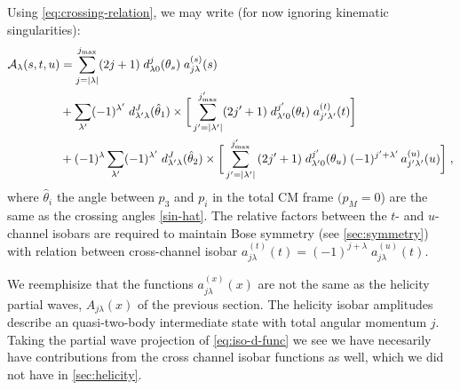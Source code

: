  Using \cref{eq:crossing-relation}, we may write (for now ignoring kinematic singularities):
\begin{align}
  \label{eq:iso-d-func}
   \mathcal{A}_\lambda(s,t,u) &= \sum_{j = |\lambda|}^{{j_\text{max}}} (2 j+1) \; d_{\lambda0}^j(\theta_s) \; a_{j \lambda}^{(s)}(s)
    \nonumber \\
   &+ \sum_{\lambda^\prime} (-1)^{\lambda^\prime} \; d_{{\lambda^\prime} \lambda}^J(\hat{\theta}_1) \times
   \bigg[
   \sum_{{j^\prime} =  |{\lambda^\prime}|}^{{j^\prime_\text{max}}} (2{j^\prime}+1) \; d_{{\lambda^\prime}0}^{j^\prime}(\theta_t) \; a_{{j^\prime} {\lambda^\prime}}^{(t)}(t)
   \bigg] \\
  &+  (-1)^\lambda \sum_{{\lambda^\prime}} (-1)^{{\lambda^\prime}} \; d^{J}_{{\lambda^\prime}\lambda }(\hat{\theta}_2)
  \times
  \bigg[
  \sum_{{j^\prime} =  |{\lambda^\prime}|}^{{j^\prime_\text{max}}} \, (2{j^\prime}+1) \; d_{{\lambda^\prime}0}^{j^\prime}(\theta_u) \;  (-1)^{{j^\prime} + {\lambda^\prime}}
    \, a_{{j^\prime} {\lambda^\prime}}^{(u)}(u)
  \bigg] \; ,
  \nonumber
  \end{align}
where \(\hat{\theta}_i\) the angle between \(p_3\) and \(p_i\) in the total CM frame \((p_M = 0\)) are the same as the crossing angles \cref{sin-hat}. The relative factors between the \(t\)- and \(u\)-channel isobars are required to maintain Bose symmetry (see \cref{sec:symmetry}) with relation between cross-channel isobar \(a_{j\lambda}^{(t)}(t) = (-1)^{j + \lambda} \; a_{j\lambda}^{(u)}(t)\).

 We reemphisize that the functions \(a^{(x)}_{j\lambda}(x)\) are not the same as the helicity partial waves, \(A_{j\lambda}(x)\) of the previous section. The helicity isobar amplitudes describe an quasi-two-body intermediate state with total angular momentum \(j\). Taking the partial wave projection of \cref{eq:iso-d-func} we see we have necesarily have contributions from the cross channel isobar functions as well, which we did not have in \cref{sec:helicity}.

